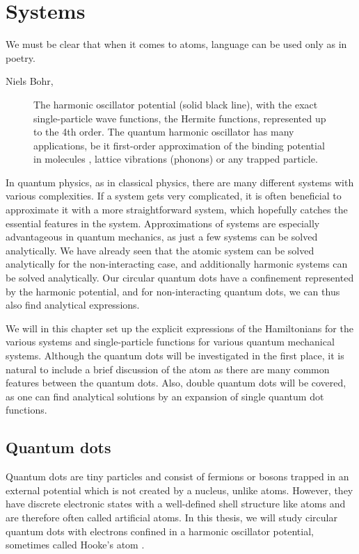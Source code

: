 \chapter{Systems} \label{chp:systems}
\epigraph{We must be clear that when it comes to atoms, language can be used only as in poetry.}{Niels Bohr, \cite{heisenberg_physics_1971}}
\begin{figure}[H]
	\centering
	
	\caption{The harmonic oscillator potential (solid black line), with the exact single-particle wave functions, the Hermite functions, represented up to the 4th order. The quantum harmonic oscillator has many applications, be it first-order approximation of the binding potential in molecules \cite{wilson_molecular_1955}, lattice vibrations (phonons) \cite{cahill_heat_1989} or any trapped particle.}
	\label{fig:harmonicoscillator}
\end{figure}

In quantum physics, as in classical physics, there are many different systems with various complexities. If a system gets very complicated, it is often beneficial to approximate it with a more straightforward system, which hopefully catches the essential features in the system. Approximations of systems are especially advantageous in quantum mechanics, as just a few systems can be solved analytically. We have already seen that the atomic system can be solved analytically for the non-interacting case, and additionally harmonic systems can be solved analytically. Our circular quantum dots have a confinement represented by the harmonic potential, and for non-interacting quantum dots, we can thus also find analytical expressions. 

We will in this chapter set up the explicit expressions of the Hamiltonians for the various systems and single-particle functions for various quantum mechanical systems. Although the quantum dots will be investigated in the first place, it is natural to include a brief discussion of the atom as there are many common features between the quantum dots. Also, double quantum dots will be covered, as one can find analytical solutions by an expansion of single quantum dot functions.

\section{Quantum dots} \label{sec:quantumdots}
Quantum dots are tiny particles and consist of fermions or bosons trapped in an external potential which is not created by a nucleus, unlike atoms. However, they have discrete electronic states with a well-defined shell structure like atoms and are therefore often called artificial atoms. In this thesis, we will study circular quantum dots with electrons confined in a harmonic oscillator potential, sometimes called Hooke's atom \cite{liang_hookes_2011}. 

